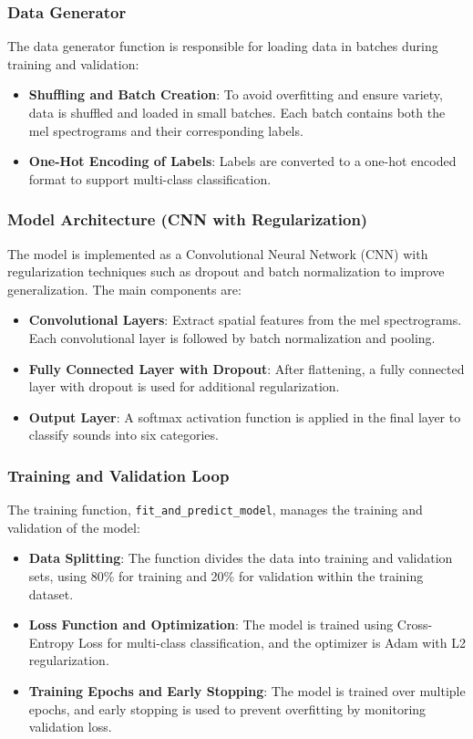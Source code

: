 \documentclass[conference]{IEEEtran}
\begin{document}
\subsubsection{Data Generator}
The data generator function is responsible for loading data in batches during training and validation:
\begin{itemize}
    \item \textbf{Shuffling and Batch Creation}: To avoid overfitting and ensure variety, data is shuffled and loaded in small batches. Each batch contains both the mel spectrograms and their corresponding labels.
    \item \textbf{One-Hot Encoding of Labels}: Labels are converted to a one-hot encoded format to support multi-class classification.
\end{itemize}

\subsubsection{Model Architecture (CNN with Regularization)}
The model is implemented as a Convolutional Neural Network (CNN) with regularization techniques such as dropout and batch normalization to improve generalization. The main components are:
\begin{itemize}
    \item \textbf{Convolutional Layers}: Extract spatial features from the mel spectrograms. Each convolutional layer is followed by batch normalization and pooling.
    \item \textbf{Fully Connected Layer with Dropout}: After flattening, a fully connected layer with dropout is used for additional regularization.
    \item \textbf{Output Layer}: A softmax activation function is applied in the final layer to classify sounds into six categories.
\end{itemize}

\subsubsection{Training and Validation Loop}
The training function, \texttt{fit\_and\_predict\_model}, manages the training and validation of the model:
\begin{itemize}
    \item \textbf{Data Splitting}: The function divides the data into training and validation sets, using 80\% for training and 20\% for validation within the training dataset.
    \item \textbf{Loss Function and Optimization}: The model is trained using Cross-Entropy Loss for multi-class classification, and the optimizer is Adam with L2 regularization.
    \item \textbf{Training Epochs and Early Stopping}: The model is trained over multiple epochs, and early stopping is used to prevent overfitting by monitoring validation loss.
\end{itemize}
\end{document}
